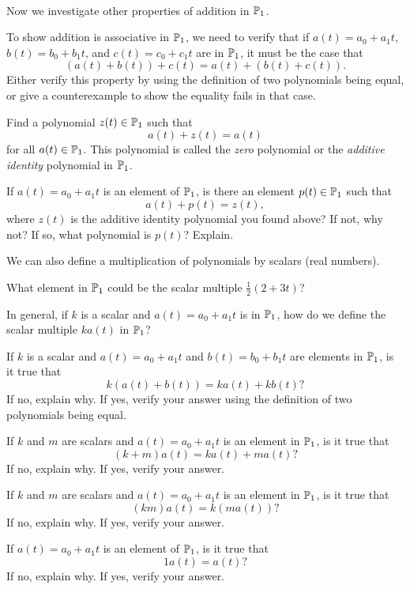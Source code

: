 \begin{pa} \label{pa:5_a} ~
\be
\item Now we investigate other properties of addition in $\mathbb{P}_1$.
	\ba
	\item To show addition is associative in $\mathbb{P}_1$, we need to verify that if $a(t) = a_0 + a_1t$, $b(t) = b_0+b_1t$, and $c(t) = c_0 + c_1t$ are in $\mathbb{P}_1$, it must be the case that
\[(a(t) + b(t)) + c(t) = a(t) + (b(t)+c(t)).\]
Either verify this property by using the definition of two polynomials being equal, or give a counterexample to show the equality fails in that case.


	\item Find a polynomial $z(t) \in \mathbb{P}_1$ such that
\[a(t) + z(t) = a(t)\]
for all $a(t) \in \mathbb{P}_1$. This polynomial is called the \emph{zero} polynomial or the \emph{additive identity} polynomial in $\mathbb{P}_1$. 

	\item If $a(t) = a_0 + a_1t$ is an element of $\mathbb{P}_1$, is there an element $p(t) \in \mathbb{P}_1$ such that
\[a(t) + p(t) = z(t),\]
where $z(t)$ is the additive identity polynomial you found above? If not, why not? If so, what polynomial is $p(t)$? Explain.

	\ea

\item  We can also define a multiplication of polynomials by scalars (real numbers). 
	\ba
	\item What element in $\mathbb{P}_1$ could be the scalar multiple $\frac{1}{2} (2+3t)$?


	\item In general, if $k$ is a scalar and $a(t) = a_0 + a_1t$ is in $\mathbb{P}_1$, how do we define the scalar multiple $ka(t)$ in $\mathbb{P}_1$?


	\item If $k$ is a scalar and $a(t) = a_0 + a_1t$ and $b(t) = b_0 + b_1t$ are elements in $\mathbb{P}_1$, is it true that
\[k(a(t) + b(t)) = ka(t) + kb(t)?\]
If no, explain why. If yes, verify your answer using the definition of two polynomials being equal.

	\item If $k$ and $m$ are scalars and $a(t) = a_0 + a_1t$ is an element in $\mathbb{P}_1$, is it true that
\[(k+m)a(t) = ka(t) + ma(t)?\]
If no, explain why. If yes, verify your answer.


	\item If $k$ and $m$ are scalars and $a(t) = a_0 + a_1t$ is an element in $\mathbb{P}_1$, is it true that
\[(km)a(t) = k(ma(t))?\]
If no, explain why. If yes, verify your answer.

	\item If $a(t) = a_0 + a_1t$ is an element of $\mathbb{P}_1$, is it true that
\[1a(t) = a(t)?\]
If no, explain why. If yes, verify your answer.


	\ea
	
\ee


\end{pa}


